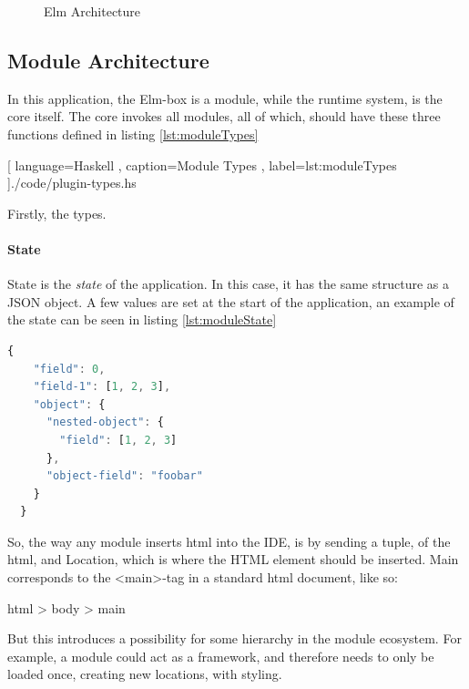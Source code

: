 \begin{figure}
  \centering
  
  \caption{Elm Architecture}
  \label{fig:elmArchitecture}
\end{figure}

\subsection{Module Architecture}

In this application, the Elm-box is a module, while the runtime system, is the
core itself. The core invokes all modules, all of which, should have these three
functions defined in listing \ref{lst:moduleTypes}

\begin{center}
  
    [ language=Haskell
    , caption={Module Types}
    , label=lst:moduleTypes
    ]{./code/plugin-types.hs}
\end{center}

Firstly, the types.

\paragraph{State}
State is the \textit{state} of the application. In this case, it has the same
structure as a JSON object. A few values are set at the start of the
application, an example of the state can be seen in listing
\ref{lst:moduleState}

\begin{lstlisting}[language=JavaScript, caption={State Example}, label=lst:moduleState]
  {
    "field": 0,
    "field-1": [1, 2, 3],
    "object": {
      "nested-object": {
        "field": [1, 2, 3]
      },
      "object-field": "foobar"
    }
  }
\end{lstlisting}

So, the way any module inserts \gls{html} into the IDE, is by sending a tuple,
of the \gls{html}, and Location, which is where the HTML element should be
inserted. Main corresponds to the <main>-tag in a standard \gls{html} document,
like so:

html > body > main

But this introduces a possibility for some hierarchy in the module ecosystem.
For example, a module could act as a framework, and therefore needs to only be
loaded once, creating new locations, with styling.


